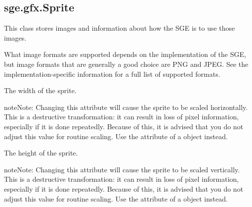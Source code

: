 \documentclass[letterpaper,10pt,english]{sphinxmanual}
\begin{document}
\subsection{sge.gfx.Sprite}
\label{gfx:sge-gfx-sprite}

\begin{fulllineitems}
\label{gfx:sge.gfx.Sprite}
This class stores images and information about how the SGE is to use
those images.

What image formats are supported depends on the implementation of
the SGE, but image formats that are generally a good choice are PNG
and JPEG.  See the implementation-specific information for a full
list of supported formats.

\begin{fulllineitems}
\label{gfx:sge.gfx.Sprite.width}
The width of the sprite.

\begin{notice}{note}{Note:}
Changing this attribute will cause the sprite to be scaled
horizontally.  This is a destructive transformation: it can
result in loss of pixel information, especially if it is done
repeatedly.  Because of this, it is advised that you do not
adjust this value for routine scaling.  Use the
 attribute of a {\hyperref[dsp:sge.dsp.Object]{\emph{}}}
object instead.
\end{notice}

\end{fulllineitems}


\begin{fulllineitems}
\label{gfx:sge.gfx.Sprite.height}
The height of the sprite.

\begin{notice}{note}{Note:}
Changing this attribute will cause the sprite to be scaled
vertically.  This is a destructive transformation: it can
result in loss of pixel information, especially if it is done
repeatedly.  Because of this, it is advised that you do not
adjust this value for routine scaling.  Use the
 attribute of a {\hyperref[dsp:sge.dsp.Object]{\emph{}}}
object instead.
\end{notice}


\end{fulllineitems}
\end{fulllineitems}
\end{document}
